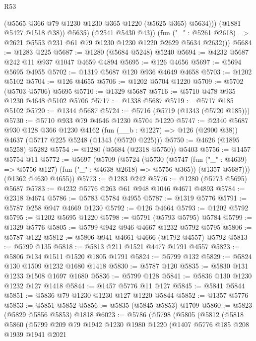\begin{lexlean}{R53}
\begin{coremodule}
                  (@5565 @366 @79 @1230 @1230 @365 @1220 (@5625 @365) @5634)))
              (@1881 @5427 @1518 @38))
            @5635)
          (@2541 @5430 @43))
        (fun ("_" : @5261 @2618) => @2621 @5553 @231 @61 @79 @1230 @1230 @1220 @2629 @5634 @2632)))
@5684 := @1283 @225
@5687 := @1280 (@5684 @5248) @5240
@5694 := @4232 @5687 @242 @11 @937 @1047 @4659 @4894
@5695 := @126 @4656
@5697 := @5694 @5695 @4955
@5702 := @1319 @5687 @120 @936 @4649 @4658
@5703 := @1202 @5102
@5704 := @126 @4655
@5706 := @1202 @5704 @1220
@5709 := @5702 (@5703 @5706) @5695
@5710 := @1329 @5687
@5716 := @5710 @478 @935 @1230 @4648 @5102 @5706
@5717 := @1338 @5687
@5719 := @5717 @185 @5102
@5720 := @1344 @5687
@5724 := @5716 (@5719 (@1343 (@5720 @185)))
@5730 := @5710 @933 @79 @4646 @1230 @5704 @1220
@5747 := @2340
    @5687
    @930
    @128
    @366
    @1230
    @4162
    (fun (__b : @1227) => @126 (@2900 @38))
    @4637
    (@5717 @225 @5248 (@1343 (@5720 @225)))
@5750 := @4626 (@1895 @5258) @5282
@5754 := @1280 (@5684 (@2318 @5750)) @5403
@5756 := @1457 @5754 @11
@5772 := @5697
    (@5709
      (@5724
        (@5730
          (@5747 (fun ("_" : @4639) => @5756 @127) (fun ("_" : @4638 @2618) => @5756 @365))
          (@1357 @5687)))
      (@1362 @4630 @4655))
@5773 := @1283 @242
@5776 := @1280 (@5773 @5695) @5687
@5783 := @4232 @5776 @263 @61 @948 @1046 @4671 @4893
@5784 := @2318 @4674
@5786 := @5783 @5784 @4955
@5787 := @1319 @5776
@5791 := @5787 @258 @947 @4669 @1230
@5792 := @126 @4664
@5793 := @1202 @5792
@5795 := @1202 @5695 @1220
@5798 := @5791 (@5793 @5795) @5784
@5799 := @1329 @5776
@5805 := @5799 @942 @946 @4667 @1232 @5792 @5795
@5806 := @5787 @122
@5812 := @5806 @941 @4661 @4666 (@1792 @4557) @5792
@5813 := @5799 @135
@5818 := @5813 @211 @1521 @4477 @1791 @4557
@5823 := @5806 @134 @1511 @1520 @1805 @1791
@5824 := @5799 @132
@5829 := @5824 @130 @1509 @1232 @1680 @1418
@5830 := @5787 @120
@5835 := @5830 @131 @1233 @1508 @1697 @1680
@5836 := @5799 @128
@5841 := @5836 @130 @1230 @1232 @127 @1418
@5844 := @1457 @5776 @11 @127
@5845 := @5841 @5844
@5851 := @5836 @79 @1230 @1230 @127 @1220 @5844
@5852 := @1357 @5776
@5853 := @5851 @5852
@5856 := @5835 (@5845 @5853) @1709
@5860 := @5823 (@5829 @5856 @5853) @1818
@6023 := @5786
    (@5798
      (@5805
        (@5812
          (@5818
            @5860
            (@5799
              @209
              @79
              @1942
              @1230
              @1980
              @1220
              (@1407
                @5776
                @185
                @208
                @1939
                @1941
                @2021

\end{coremodule}
\end{lexlean}
